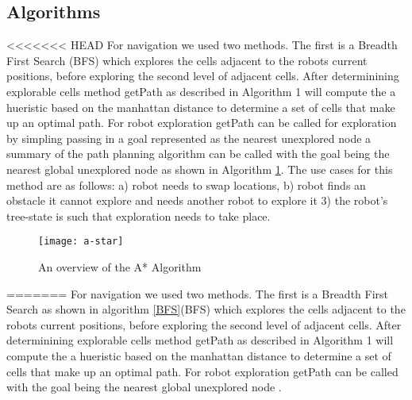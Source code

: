 \subsection{Algorithms}
<<<<<<< HEAD
For navigation we used two methods. The first is a Breadth First Search (BFS) which explores the cells adjacent to the robots
current positions, before exploring the second level of adjacent cells. After determinining explorable cells method getPath as described in Algorithm 1 will compute the a hueristic based on the manhattan distance to determine a set of cells that make up an optimal path. For robot exploration getPath can be called for exploration by simpling passing in a goal represented as the nearest unexplored node a summary of the path planning algorithm can be called with the goal being the nearest global unexplored node as shown in Algorithm \ref{fig:a-star}.
 The use cases for this method are as follows: a) robot needs to swap locations, b) robot finds an obstacle it cannot explore and needs another robot to explore it 3) the robot's tree-state is such that exploration needs to take place.

 \begin{figure}[H]
   \centering
     \texttt{[image: a-star]}
   \caption{An overview of the A* Algorithm \cite{a-star}} \label{fig:a-star}
 \end{figure}



=======
For navigation we used two methods. The first is a Breadth First Search as shown in algorithm \ref{BFS}(BFS) which explores the cells adjacent to the robots
current positions, before exploring the second level of adjacent cells. After determinining explorable cells method getPath as described in Algorithm 1 will compute the a hueristic based on the manhattan distance to determine a set of cells that make up an optimal path. For robot exploration getPath can be called with the goal being the nearest global unexplored node \cite{pound}.


